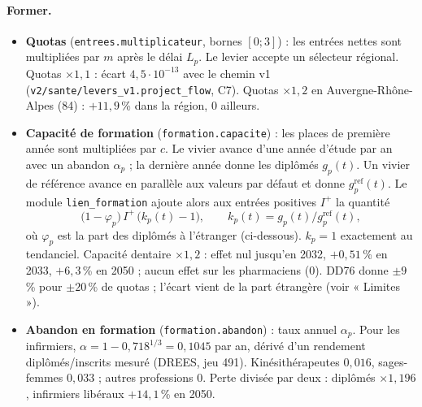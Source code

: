 \paragraph{Former.}
\begin{itemize}
  \item \textbf{Quotas} (\texttt{entrees.multiplicateur}, bornes $[0 ; 3]$) : les entrées nettes sont multipliées
        par $m$ après le délai $L_p$. Le levier accepte un sélecteur régional. Quotas $\times 1{,}1$ : écart
        $4{,}5\cdot10^{-13}$\mesure{} avec le chemin v1 (\texttt{v2/sante/levers\_v1.project\_flow}, C7).
        Quotas $\times 1{,}2$ en Auvergne-Rhône-Alpes (84) : $+11{,}9$\mesure{}\,\% dans la région, 0\mesure{}
        ailleurs.
  \item \textbf{Capacité de formation} (\texttt{formation.capacite}) : les places de première année sont
        multipliées par $c$. Le vivier avance d'une année d'étude par an avec un abandon $\alpha_p$ ; la dernière
        année donne les diplômés $g_p(t)$. Un vivier de référence avance en parallèle aux valeurs par défaut et
        donne $g^{\mathrm{ref}}_p(t)$. Le module \texttt{lien\_formation} ajoute alors aux entrées positives
        $I^{+}$ la quantité
        \begin{equation}\label{jum:eq:lien}
          \bigl(1 - \varphi_p\bigr)\, I^{+}\, \bigl(k_p(t) - 1\bigr), \qquad k_p(t) = g_p(t) / g^{\mathrm{ref}}_p(t),
        \end{equation}
        où $\varphi_p$ est la part des diplômés à l'étranger (ci-dessous). $k_p = 1$ exactement au tendanciel.
        Capacité dentaire $\times 1{,}2$ : effet nul\mesure{} jusqu'en 2032, $+0{,}51$\mesure{}\,\% en 2033,
        $+6{,}3$\mesure{}\,\% en 2050 ; aucun effet sur les pharmaciens (0\mesure{}). DD76 donne $\pm 9$\,\% pour
        $\pm 20$\,\% de quotas \citep{drees2021dd76} ; l'écart vient de la part étrangère (voir « Limites »).
  \item \textbf{Abandon en formation} (\texttt{formation.abandon}) : taux annuel $\alpha_p$. Pour les infirmiers,
        $\alpha = 1 - 0{,}718^{1/3} = 0{,}1045$\derive{} par an, dérivé d'un rendement diplômés/inscrits mesuré
        (DREES, jeu 491). Kinésithérapeutes $0{,}016$\derive{}, sages-femmes $0{,}033$\derive{} ; autres
        professions $0$\suppose{}. Perte divisée par deux : diplômés $\times 1{,}196$\mesure{}, infirmiers libéraux
        $+14{,}1$\mesure{}\,\% en 2050.
\end{itemize}

